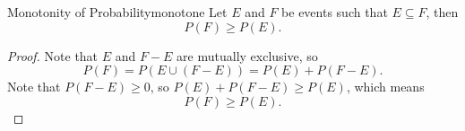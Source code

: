 \documentclass[math]{amznotes}
\theoremstyle{remark}
\begin{document}
\begin{thmbox}{Monotonity of Probability}{monotone}
    Let $E$ and $F$ be events such that $E \subseteq F$, then 
    \begin{equation*}
        P(F) \geq P(E).
    \end{equation*}
    \tcblower   
    \begin{proof}
        Note that $E$ and $F - E$ are mutually exclusive, so 
        \begin{equation*}
            P(F) = P(E \cup (F - E)) = P(E) + P(F - E).
        \end{equation*}
        Note that $P(F - E) \geq 0$, so $P(E) + P(F - E) \geq P(E)$, which means
        \begin{equation*}
            P(F) \geq P(E).
        \end{equation*}
    \end{proof}
\end{thmbox}
\end{document}
